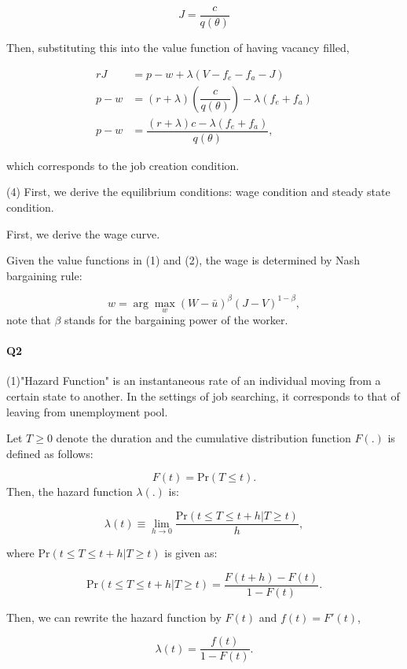 \documentclass[dvipdfmx, 12pt]{article}
\begin{document}
\[
J = \dfrac{c}{q (\theta)}
\]

Then, substituting this into the value function of having vacancy filled,

\begin{align*}
  rJ &= p - w + \lambda (V - f_e - f_a - J) \\
  p - w &= (r + \lambda) \left( \dfrac{c}{q (\theta)} \right) - \lambda (f_e + f_a) \\
  p - w &= \dfrac{(r + \lambda)c - \lambda (f_e + f_a)}{q (\theta)},
\end{align*}

which corresponds to the job creation condition.

\vspace{1zw}

(4) First, we derive the equilibrium conditions: wage condition and steady state condition.

First, we derive the wage curve.

Given the value functions in (1) and (2), the wage is determined by Nash bargaining rule:

\[
w = \arg \max_w (W - \bar{u})^\beta (J - V)^{1 - \beta},
\]
note that $\beta$ stands for the bargaining power of the worker.

\paragraph{Q2} \hspace{1zw}

(1)"Hazard Function" is an instantaneous rate of an individual moving from a certain state to another. In the settings of job searching, it corresponds to that of leaving from unemployment pool.

Let $T \geq 0$ denote the duration and the cumulative distribution function $F(.)$ is defined as follows:

\[
F(t) = \text{Pr}(T \leq t).
\]
Then, the hazard function $\lambda(.)$ is:

\[
\lambda (t) \equiv \lim_{h \to 0} \dfrac{\text{Pr}(t \leq T \leq t + h | T \geq t)}{h},
\]

where $\text{Pr}(t \leq T \leq t + h | T \geq t)$ is given as:

\[
\text{Pr}(t \leq T \leq t + h | T \geq t) = \dfrac{F(t+h) - F(t)}{1 - F(t)}.
\]

Then, we can rewrite the hazard function by $F(t)$ and $f(t) = F'(t)$,

\[
\lambda(t) = \dfrac{f(t)}{1 - F(t)}.
\]
\end{document}
